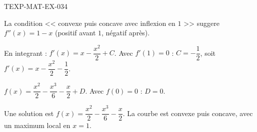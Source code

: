 \begin{corrige}{TEXP-MAT-EX-034}

La condition << convexe puis concave avec inflexion en $1$ >> suggere $f''(x) = 1 - x$ (positif avant $1$, négatif après).


En integrant : $f'(x) = x - \dfrac{x^2}{2} + C$. Avec $f'(1)=0$ : $C = -\dfrac{1}{2}$, soit $f'(x) = x - \dfrac{x^2}{2} - \dfrac{1}{2}$.

$f(x) = \dfrac{x^2}{2} - \dfrac{x^3}{6} - \dfrac{x}{2} + D$. Avec $f(0)=0$ : $D=0$.

Une solution est $\boxed{f(x) = \dfrac{x^2}{2} - \dfrac{x^3}{6} - \dfrac{x}{2}}$. La courbe est convexe puis concave, avec un maximum local en $x=1$.

\end{corrige}
